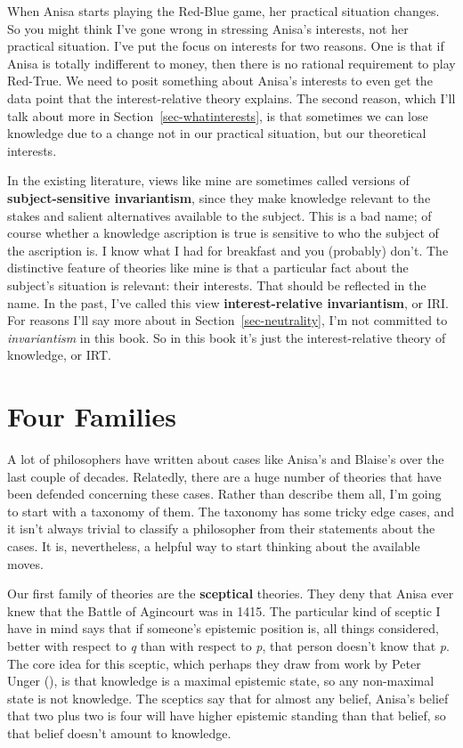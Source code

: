 \documentclass[
  12pt,
  letterpaper,
]{scrbook}
\begin{document}
When Anisa starts playing the Red-Blue game, her practical situation
changes. So you might think I've gone wrong in stressing Anisa's
interests, not her practical situation. I've put the focus on interests
for two reasons. One is that if Anisa is totally indifferent to money,
then there is no rational requirement to play Red-True. We need to posit
something about Anisa's interests to even get the data point that the
interest-relative theory explains. The second reason, which I'll talk
about more in Section~\ref{sec-whatinterests}, is that sometimes we can
lose knowledge due to a change not in our practical situation, but our
theoretical interests.

In the existing literature, views like mine are sometimes called
versions of \textbf{subject-sensitive invariantism}, since they make
knowledge relevant to the stakes and salient alternatives available to
the subject. This is a bad name; of course whether a knowledge
ascription is true is sensitive to who the subject of the ascription is.
I know what I had for breakfast and you (probably) don't. The
distinctive feature of theories like mine is that a particular fact
about the subject's situation is relevant: their interests. That should
be reflected in the name. In the past, I've called this view
\textbf{interest-relative invariantism}, or IRI. For reasons I'll say
more about in Section~\ref{sec-neutrality}, I'm not committed to
\emph{invariantism} in this book. So in this book it's just the
interest-relative theory of knowledge, or IRT.

\section{Four Families}\label{sec-fourfamilies}

A lot of philosophers have written about cases like Anisa's and Blaise's
over the last couple of decades. Relatedly, there are a huge number of
theories that have been defended concerning these cases. Rather than
describe them all, I'm going to start with a taxonomy of them. The
taxonomy has some tricky edge cases, and it isn't always trivial to
classify a philosopher from their statements about the cases. It is,
nevertheless, a helpful way to start thinking about the available moves.

Our first family of theories are the \textbf{sceptical} theories. They
deny that Anisa ever knew that the Battle of Agincourt was in 1415. The
particular kind of sceptic I have in mind says that if someone's
epistemic position is, all things considered, better with respect to
\emph{q} than with respect to \emph{p}, that person doesn't know that
\emph{p}. The core idea for this sceptic, which perhaps they draw from
work by Peter Unger (), is that knowledge
is a maximal epistemic state, so any non-maximal state is not knowledge.
The sceptics say that for almost any belief, Anisa's belief that two
plus two is four will have higher epistemic standing than that belief,
so that belief doesn't amount to knowledge.
\end{document}
